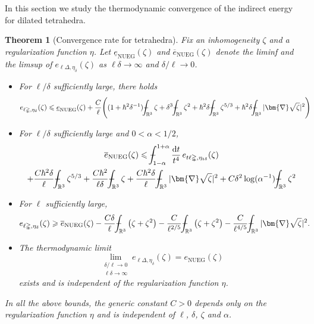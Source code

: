 \documentclass[final,onefignum,onetabnum,reqno]{amsart}
\newtheorem{theorem}{Theorem}[section]
\theoremstyle{remark}
\renewcommand{\le}{\leqslant}
\renewcommand{\ge}{\geqslant}
\newcommand{\ol}[1]{\overline{#1}}
\newcommand{\ul}[1]{\underline{#1}}
\newcommand{\RR}{\mathbb{R}}
\newcommand{\NUEG}{\mathrm{NUEG}} %
\newcommand{\grad}{\bm{\nabla}} %
\newcommand{\tetra}{\mathbb{\Delta}} %
\newcommand{\dd}{\mathrm{d}} %
\def\Xint#1{\mathchoice
{\XXint\displaystyle\textstyle{#1}}%
{\XXint\textstyle\scriptstyle{#1}}%
{\XXint\scriptstyle\scriptscriptstyle{#1}}%
{\XXint\scriptscriptstyle\scriptscriptstyle{#1}}%
\!\int}
\def\XXint#1#2#3{{\setbox0=\hbox{$#1{#2#3}{\int}$ }
\vcenter{\hbox{$#2#3$ }}\kern-.6\wd0}}
\def\dashint{\Xint-}
\begin{document}
In this section we study the thermodynamic convergence of the indirect energy
for dilated tetrahedra.

\begin{theorem}[Convergence rate for tetrahedra]\label{tetrathermo}
Fix an inhomogeneity $\zeta$ and a regularization function $\eta$. Let $\ul{e}_\NUEG(\zeta)$ and $\ol{e}_\NUEG(\zeta)$ denote the liminf and the limsup of $e_{\ell\tetra,\eta_\delta}(\zeta)$
as $\ell\delta\to\infty$ and $\delta/\ell\to 0$. 
\begin{itemize}
\item[(i)] For $\ell/\delta$ sufficiently large, there holds
\begin{align*}
&e_{\ell\tetra,\eta_{\delta}}(\zeta)\le \ul{e}_\NUEG(\zeta) +\frac{C}{\ell}\Bigg( (1+\hbar^2\delta^{-1}) \dashint_{\RR^3} \zeta + \delta^3\dashint_{\RR^3} \zeta^2 + \hbar^2\delta \dashint_{\RR^3} \zeta^{5/3} + \hbar^2\delta \dashint_{\RR^3} |\grad\sqrt{\zeta}|^2\Bigg)
\end{align*}
\item[(ii)] For $\ell/\delta$ sufficiently large and $0<\alpha<1/2$, 
\begin{multline*}
\ol{e}_{\NUEG}(\zeta)\le \dashint_{1-\alpha}^{1+\alpha}\frac{\dd t}{t^4}\, e_{t\ell\tetra,\eta_{t\delta}}(\zeta)\\
+\frac{C\hbar^2\delta}{\ell} \dashint_{\RR^3}\zeta^{5/3} +  \frac{C\hbar^2}{\ell\delta} \dashint_{\RR^3} \zeta + \frac{C\hbar^2\delta}{\ell}\dashint_{\RR^3} |\grad\sqrt{\zeta}|^2+ C\delta^2\log(\alpha^{-1}) \dashint_{\RR^3}\zeta^2
\end{multline*}
\item[(iii)] For $\ell$  sufficiently large, 
\begin{align*}
&e_{\ell\tetra,\eta_{\delta}}(\zeta)\ge \ol{e}_{\NUEG}(\zeta) -\frac{C\delta}{\ell}\dashint_{\RR^3} \left(\zeta +\zeta^2\right) -\frac{C}{\ell^{2/5}}\dashint_{\RR^3} \left(\zeta +\zeta^2\right) - \frac{C}{\ell^{4/5}}\dashint_{\RR^3} |\grad\sqrt{\zeta}|^2.
\end{align*}
\item[(iv)] The thermodynamic limit
$$
\lim_{\substack{\delta/\ell\to 0\\\ell\delta\to\infty}} e_{\ell\tetra,\eta_\delta}(\zeta)=e_\NUEG(\zeta)
$$
exists and is independent of the regularization function $\eta$.
\end{itemize}
In all the above bounds, the generic constant $C>0$ depends only on the regularization function $\eta$ and is independent of $\ell$, $\delta$, $\zeta$ and $\alpha$. 
\end{theorem}
\end{document}
